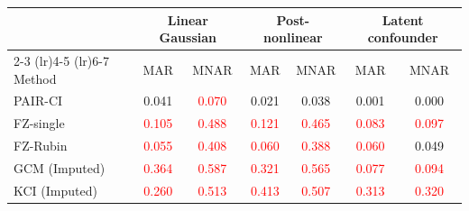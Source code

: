 \begin{tabular}{l*{6}{c}}
    \toprule
                  & \multicolumn{2}{c}{Linear Gaussian} & \multicolumn{2}{c}{Post-nonlinear} & \multicolumn{2}{c}{Latent confounder} \\
    \cmidrule(lr){2-3} \cmidrule(lr){4-5} \cmidrule(lr){6-7}
    Method        & MAR & MNAR & MAR & MNAR & MAR & MNAR \\
    \midrule
    PAIR-CI        & 0.041 & \textcolor{red}{0.070} & 0.021 & 0.038 & 0.001 & 0.000 \\
    FZ-single      & \textcolor{red}{0.105} & \textcolor{red}{0.488} & \textcolor{red}{0.121} & \textcolor{red}{0.465} & \textcolor{red}{0.083} & \textcolor{red}{0.097} \\
    FZ-Rubin       & \textcolor{red}{0.055} & \textcolor{red}{0.408} & \textcolor{red}{0.060} & \textcolor{red}{0.388} & \textcolor{red}{0.060} & 0.049 \\
    GCM (Imputed)  & \textcolor{red}{0.364} & \textcolor{red}{0.587} & \textcolor{red}{0.321} & \textcolor{red}{0.565} & \textcolor{red}{0.077} & \textcolor{red}{0.094} \\
    KCI (Imputed)  & \textcolor{red}{0.260} & \textcolor{red}{0.513} & \textcolor{red}{0.413} & \textcolor{red}{0.507} & \textcolor{red}{0.313} & \textcolor{red}{0.320} \\
    \bottomrule
\end{tabular}
